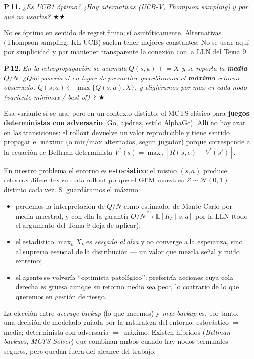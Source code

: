 \documentclass[11pt,a4paper]{article}
\newcommand{\preg}[2]{%
  \par\medskip
  \noindent\textbf{P\,#1.} \emph{#2}\par\smallskip}
\newcommand{\resp}[1]{%
  \noindent #1\par}
\begin{document}
\preg{11}{¿Es UCB1 óptimo? ¿Hay alternativas (UCB-V, Thompson sampling) y
por qué no usarlas? \hfill$\bigstar\bigstar$}
\resp{%
No es óptimo en sentido de regret finito; sí asintóticamente. Alternativas
(Thompson sampling, KL-UCB) suelen tener mejores constantes. No se usan
aquí por simplicidad y por mantener transparente la conexión con la LLN
del Tema 9.}

\preg{12}{En la retropropagación se acumula $Q(s,a)\mathrel{+}=X$ y se
reporta la \textbf{media} $Q/N$. ¿Qué pasaría si en lugar de promediar
guardáramos el \textbf{máximo} retorno observado, $Q(s,a)\leftarrow
\max\{Q(s,a),X\}$, y eligiéramos por max en cada nodo (variante
\emph{minimax} / \emph{best-of}) ? \hfill$\bigstar$}
\resp{%
Esa variante sí se usa, pero en un contexto distinto: el MCTS clásico
para \textbf{juegos deterministas con adversario} (Go, ajedrez, estilo
AlphaGo). Allí no hay azar en las transiciones: el rollout devuelve un
valor reproducible y tiene sentido propagar el máximo (o min/max
alternados, según jugador) porque corresponde a la ecuación de Bellman
determinista
$V^*(s)=\max_a [R(s,a)+V^*(s')]$.

\smallskip
En nuestro problema el entorno es \textbf{estocástico}: el mismo
$(s,a)$ produce retornos diferentes en cada rollout porque el GBM
muestrea $Z\sim\mathcal{N}(0,1)$ distinto cada vez. Si guardáramos el
máximo:
\begin{itemize}\setlength{\itemsep}{0pt}
  \item perdemos la interpretación de $Q/N$ como estimador de Monte Carlo
        por media muestral, y con ella la garantía
        $Q/N \xrightarrow{\text{c.s.}} \mathbb{E}[R_T\mid s,a]$ por la LLN
        (todo el argumento del Tema 9 deja de aplicar);
  \item el estadístico $\max_k X_k$ es \emph{sesgado al alza} y no
        converge a la esperanza, sino al supremo esencial de la
        distribución --- un valor que mezcla señal y ruido extremo;
  \item el agente se volvería ``optimista patológico'': preferiría
        acciones cuya cola derecha es gruesa aunque su retorno medio sea
        peor, lo contrario de lo que queremos en gestión de riesgo.
\end{itemize}

\smallskip
La elección entre \emph{average backup} (lo que hacemos) y \emph{max
backup} es, por tanto, una decisión de modelado guiada por la
naturaleza del entorno: estocástico $\Rightarrow$ media; determinista
con adversario $\Rightarrow$ máximo. Existen híbridos
(\emph{Bellman backups}, \emph{MCTS-Solver}) que combinan ambos cuando
hay nodos terminales seguros, pero quedan fuera del alcance del
trabajo.}
\end{document}
